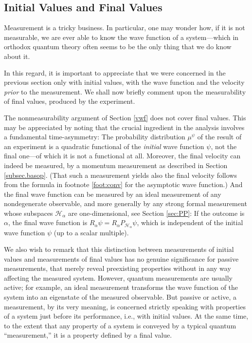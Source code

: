 \documentclass[12pt]{article}
\newcommand{\wf}{wave function}
\renewcommand{\a}{\alpha}
\newcommand{\Ha}{{\H}_{\a}}
\renewcommand{\H}{\mbox{$\mathcal{H}$}}
\newcommand{\Pa}{ P_{ {\mathcal{H}_{\a} } } }
\newcommand{\Aa}{R_{\a}}
\begin{document}
\subsection{Initial Values and Final Values}\label{secIVFV}

Measurement is a tricky business. In particular, one may wonder how,
if it is not measurable, we are ever able to know the \wf{} of a
system---which in orthodox quantum theory often seems to be the only
thing that we do know about it.

In this regard, it is important to appreciate that we were concerned
in the previous section only with initial values, with the wave
function and the velocity {\it prior\/} to the measurement. We shall
now briefly comment upon the measurability of final values, produced
by the experiment.

The nonmeasurability argument of Section \ref{vwf} does not cover
final values.  This may be appreciated by noting that the crucial
ingredient in the analysis involves a fundamental time-asymmetry: The
probability distribution $\mu^\psi$ of the result of an experiment is
a quadratic functional of the {\it initial\/} wave function $\psi$,
not the final one---of which it is not a functional at all. Moreover,
the final velocity can indeed be measured, by a momentum measurement
as described in Section \ref{subsec.basop}.  (That such a measurement
yields also the final velocity follows {}from the formula in footnote
\ref{foot:conv} for the asymptotic wave function.) And the final wave
function can be measured by an ideal measurement of any nondegenerate
observable, and more generally by any strong formal measurement whose
subspaces $\Ha$ are one-dimensional, see Section \ref{sec:PP}: If the
outcome is $\a$, the final \wf{} is $\Aa \psi= \Aa \Pa \psi$, which is
independent of the initial \wf{} $\psi$ (up to a scalar multiple).

We also wish to remark that this distinction between measurements of
initial values and measurements of final values has no genuine
significance for passive measurements, that merely reveal preexisting
properties without in any way affecting the measured system. However,
quantum measurements are usually active; for example, an ideal
measurement transforms the wave function of the system into an
eigenstate of the measured observable.  But passive or active, a
measurement, by its very meaning, is concerned strictly speaking with
properties of a system just before its performance, i.e., with initial
values. At the same time, to the extent that any property of a system
is conveyed by a typical quantum ``measurement,'' it is a property
defined by a final value.
\end{document}

